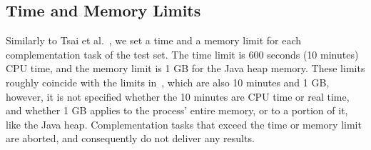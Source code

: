 







\subsection{Time and Memory Limits}
\label{4_limits}
Similarly to Tsai et al.~\cite{2011_tsai}, we set a time and  a memory limit for each complementation task of the \goal{} test set. The time limit is 600 seconds (10 minutes) CPU time, and the memory limit is 1 GB for the Java heap memory. These limits roughly coincide with the limits in~\cite{2011_tsai}, which are also 10 minutes and 1 GB, however, it is not specified whether the 10 minutes are CPU time or real time, and whether 1 GB applies to the process' entire memory, or to a portion of it, like the Java heap. Complementation tasks that exceed the time or memory limit are aborted, and consequently do not deliver any results.


